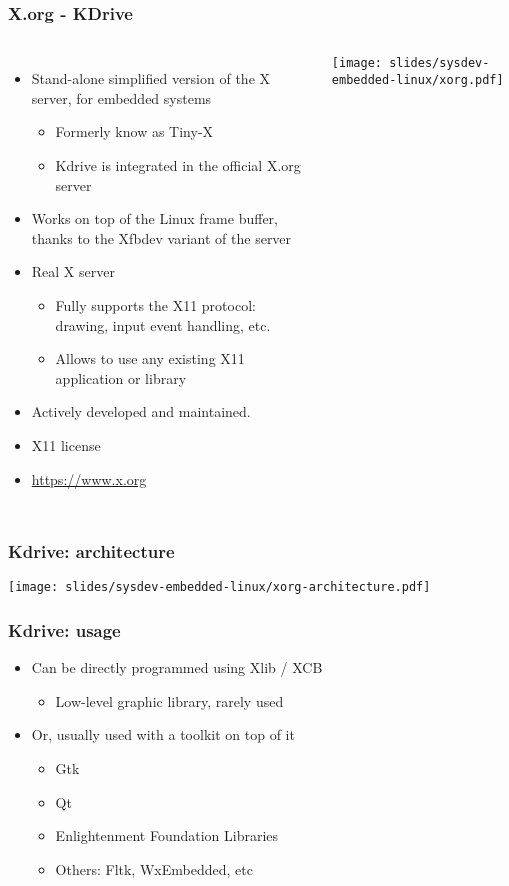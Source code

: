\begin{frame}
  \frametitle{X.org - KDrive}
  \begin{columns}[T]
    \begin{itemize}
    \item Stand-alone simplified version of the X server, for embedded
      systems
      \begin{itemize}
      \item Formerly know as Tiny-X
      \item Kdrive is integrated in the official X.org server
      \end{itemize}
    \item Works on top of the Linux frame buffer, thanks to the Xfbdev
      variant of the server
    \item Real X server
      \begin{itemize}
      \item Fully supports the X11 protocol: drawing, input event
        handling, etc.
      \item Allows to use any existing X11 application or library
      \end{itemize}
    \item Actively developed and maintained.
    \item X11 license
    \item \url{https://www.x.org}
    \end{itemize}
    \texttt{[image: slides/sysdev-embedded-linux/xorg.pdf]}
  \end{columns}
\end{frame}

\begin{frame}
  \frametitle{Kdrive: architecture}
  \begin{center}
    \texttt{[image: slides/sysdev-embedded-linux/xorg-architecture.pdf]}
  \end{center}
\end{frame}

\begin{frame}
  \frametitle{Kdrive: usage}
  \begin{itemize}
  \item Can be directly programmed using Xlib / XCB
    \begin{itemize}
    \item Low-level graphic library, rarely used
    \end{itemize}
  \item Or, usually used with a toolkit on top of it
    \begin{itemize}
    \item Gtk
    \item Qt
    \item Enlightenment Foundation Libraries
    \item Others: Fltk, WxEmbedded, etc
    \end{itemize}
  \end{itemize}
\end{frame}

